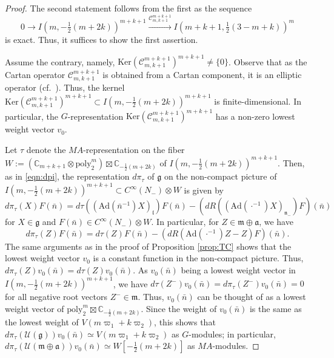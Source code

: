 \documentclass[reqno,11pt]{amsart}
\theoremstyle{remark}
\numberwithin{equation}{section}
\newcommand{\fa}{{\mathfrak a}}
\newcommand{\fg}{{\mathfrak g}}
\newcommand{\fl}{{\mathfrak l}}
\newcommand{\fm}{{\mathfrak m}}
\newcommand{\fn}{{\mathfrak n}}
\newcommand{\C}{\mathbb{C}}
\newcommand{\Ad}{\mathrm{Ad}}
\newcommand{\Cal}{\mathcal}
\newcommand{\poly}{\mathrm{poly}}
\newcommand{\To}{\longrightarrow}
\newcommand{\Ker}{\mathrm{Ker}}
\begin{document}
\begin{proof}
The second statement follows from the first as the sequence
\begin{equation*}
0\To
I(m, -\tfrac{1}{2}(m+2k))^{m+k+1}
\stackrel{\Cal{C}^{m+k+1}_{m,k+1}}{\To}
I(m+k+1, \tfrac{1}{2}(3-m+k))^{m}
\end{equation*}
is exact. Thus, it suffices to show the first assertion.

Assume the contrary, namely,
$\Ker \left(\Cal{C}^{m+k+1}_{m,k+1} \right)^{m+k+1}\neq \{0\}$. 
Observe that as the Cartan operator $\Cal{C}^{m+k+1}_{m,k+1}$ is 
obtained from a Cartan component, it is an elliptic operator 
(cf.\ \cite{KOPWZ96}).
Thus, the kernel $\Ker(\Cal{C}^{m+k+1}_{m,k+1})^{m+k+1}
\subset I(m, -\tfrac{1}{2}(m+2k))^{m+k+1}$ 
is finite-dimensional. In particular, the $G$-representation
$\Ker(\Cal{C}^{m+k+1}_{m,k+1})^{m+k+1}$ has a non-zero lowest weight vector $v_0$.

Let $\tau$ denote the $MA$-representation on the fiber 
$W:=(\C_{m+k+1} \otimes \poly^{m}_2) \boxtimes \C_{-\tfrac{1}{2}(m+2k)}$
of $I(m, -\tfrac{1}{2}(m+2k))^{m+k+1}$. Then, as in  \eqref{eqn:dpi},
the representation $d\pi_\tau$ of $\fg$ on the non-compact picture of 
$I(m, -\tfrac{1}{2}(m+2k))^{m+k+1} \subset C^\infty(N_-)\otimes W$
is given by 
\begin{equation*}
d\pi_\tau(X) F(\bar{n})= 
d\tau((\Ad(\bar{n}^{-1})X)_{\fl})F(\bar{n})-(dR((\Ad(\cdot^{-1})X)_{\fn_-})F)(\bar{n})
\end{equation*}
for $X \in \fg$ and $F(\bar{n})\in C^\infty(N_-)\otimes W$.
In particular, for $Z \in \fm\oplus \fa$,
we have
\begin{equation*}
d\pi_\tau(Z)F(\bar{n})=d\tau(Z)F(\bar{n})-(dR(\Ad(\cdot^{-1})Z-Z)F)(\bar{n}).
\end{equation*}
The same arguments as in the proof of Proposition \ref{prop:TC} shows that 
the lowest weight vector $v_0$ is a constant function in the non-compact picture. 
Thus, $d\pi_\tau(Z)v_0(\bar{n})=d\tau(Z)v_0(\bar{n})$.
As $v_0(\bar{n})$ being a lowest weight vector in $I(m, -\tfrac{1}{2}(m+2k))^{m+k+1}$,
we have $d\tau(Z^-)v_0(\bar{n})=d\pi_\tau(Z^-)v_0(\bar{n})=0$ for all
negative root vectors $Z^-\in \fm$. Thus, $v_0(\bar{n})$ can be thought of as a lowest weight vector
of $\poly^{m}_2 \boxtimes \C_{-\tfrac{1}{2}(m+2k)}$. 
Since the weight of $v_0(\bar{n})$ is the same as the lowest weight of $V(m\varpi_1+k\varpi_2)$,
this shows that $d\pi_\tau(\Cal{U}(\fg))v_0(\bar{n}) \simeq V(m\varpi_1+k\varpi_2)$
as $G$-modules;
in particular, 
$d\pi_\tau(\Cal{U}(\fm\oplus \fa))v_0(\bar{n})
\simeq W[-\tfrac{1}{2}(m+2k)]$
as $MA$-modules. 


\end{proof}
\end{document}
